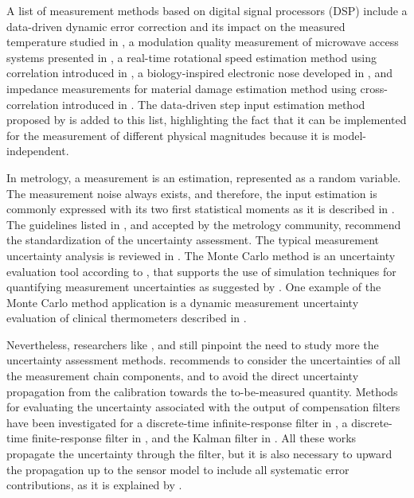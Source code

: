 A list of measurement methods based on digital signal processors (DSP) include 
a data-driven dynamic error correction and its impact on the measured temperature studied in \citet{Saggin01},
a modulation quality measurement of microwave access systems presented in \citet{Angrisani10}, 
a real-time rotational speed estimation method using correlation introduced in \citet{Wang14},
a biology-inspired electronic nose developed in \citet{Jing16},
and impedance measurements for material damage estimation method using cross-correlation introduced in \citet{deCastro19}.
The data-driven step input estimation method proposed by \citet{Markovsky15cep} is added to this list, highlighting the fact that it can be implemented for the measurement of different physical magnitudes because it is model-independent.


In metrology, a measurement is an estimation, represented as a random variable.
The measurement noise always exists, and therefore, the input estimation is commonly expressed with its two first statistical moments as it is described in \citet{Ferrero06}.
The guidelines listed in \citet{GUM08}, and accepted by the metrology community, recommend the standardization of the uncertainty assessment.
The typical measurement uncertainty analysis \color{blue} is \color{black} reviewed in \citet{daSilva12}.
The Monte Carlo method is an uncertainty evaluation tool according to \citet{Cox06},
that supports the use of simulation techniques for quantifying measurement uncertainties as suggested by \citet{Esward16}.
One example of the Monte Carlo method application is a dynamic measurement uncertainty evaluation of clinical thermometers described in \citet{Ogorevc16}.

Nevertheless, researchers like \citet{Esward09}, and \citet{Hessling10} still pinpoint the need to study more the uncertainty assessment methods.
\citet{Diniz17} recommends to consider the uncertainties of all the measurement chain components, and to avoid the direct uncertainty propagation from the calibration towards the to-be-measured quantity.  
Methods for evaluating the uncertainty associated with the output of compensation filters have been investigated for
a discrete-time infinite-response filter in \citet{Link09},
a discrete-time finite-response filter in \citet{Elster07, Elster08}, and
the Kalman filter in \citet{Eichstadt16b}.
All these works propagate the uncertainty through the filter, but it is also necessary to upward the propagation up to the sensor model to include all systematic error contributions, as it is explained by \citet{Hessling11}.



